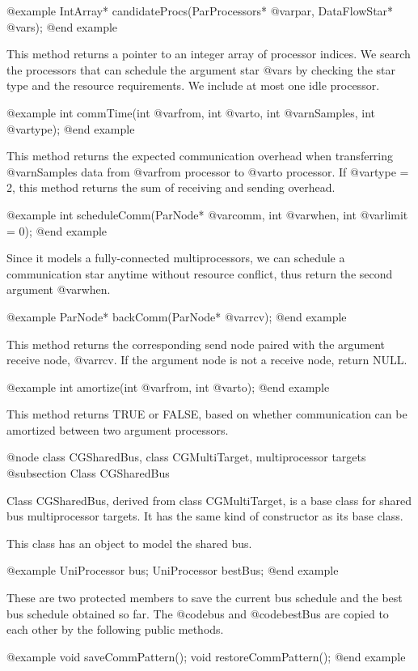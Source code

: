 @example
IntArray* candidateProcs(ParProcessors* @var{par}, DataFlowStar* @var{s});
@end example

This method returns a pointer to an integer array of processor indices.
We search the processors that can schedule the argument star @var{s}
by checking the star type and the resource requirements. We include at most
one idle processor.

@example
int commTime(int @var{from}, int @var{to}, int @var{nSamples}, int @var{type});
@end example

This method returns the expected communication overhead when transferring
@var{nSamples} data from @var{from} processor to @var{to} processor. If
@var{type} = 2, this method returns the sum of receiving and sending
overhead.

@example
int scheduleComm(ParNode* @var{comm}, int @var{when}, int @var{limit} = 0);
@end example

Since it models a fully-connected multiprocessors, we can schedule
a communication star anytime without resource conflict, thus return the
second argument @var{when}.

@example
ParNode* backComm(ParNode* @var{rcv});
@end example

This method returns the corresponding send node paired with the argument
receive node, @var{rcv}. If the argument node is not a receive node, return
NULL.

@example
int amortize(int @var{from}, int @var{to});
@end example

This method returns TRUE or FALSE, based on whether communication can be
amortized between two argument processors.

@node class CGSharedBus, class CGMultiTarget, multiprocessor targets
@subsection Class CGSharedBus

Class CGSharedBus, derived from class CGMultiTarget, is a base class for
shared bus multiprocessor targets. It has the same kind of constructor as
its base class.

This class has an object to model the shared bus.

@example
UniProcessor bus;
UniProcessor bestBus;
@end example

These are two protected members to save the current bus schedule and the
best bus schedule obtained so far. The @code{bus} and @code{bestBus}
are copied to each other by the following public methods.

@example
void saveCommPattern();
void restoreCommPattern();
@end example

